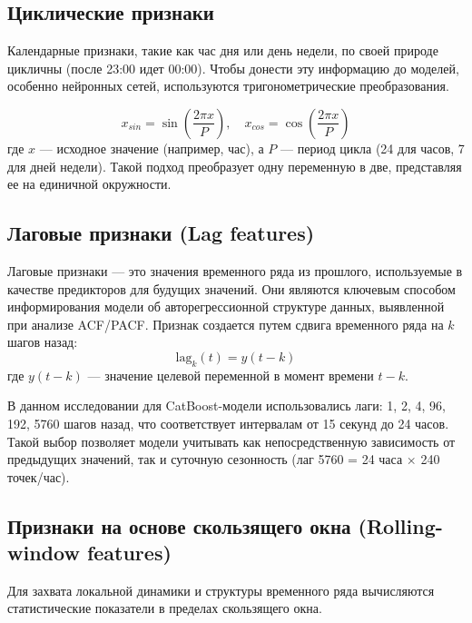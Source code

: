 \subsection{Циклические признаки}

\hspace*{1.25cm}Календарные признаки, такие как час дня или день недели, по своей природе цикличны (после 23:00 идет 00:00). Чтобы донести эту информацию до моделей, особенно нейронных сетей, используются тригонометрические преобразования.

\begin{equation}
	x_{sin} = \sin\left(\frac{2\pi x}{P}\right), \quad x_{cos} = \cos\left(\frac{2\pi x}{P}\right)
\end{equation}
где $x$ — исходное значение (например, час), а $P$ — период цикла (24 для часов, 7 для дней недели). Такой подход преобразует одну переменную в две, представляя ее на единичной окружности.

\subsection{Лаговые признаки (Lag features)}

\hspace*{1.25cm}Лаговые признаки — это значения временного ряда из прошлого, используемые в качестве предикторов для будущих значений. Они являются ключевым способом информирования модели об авторегрессионной структуре данных, выявленной при анализе ACF/PACF. Признак создается путем сдвига временного ряда на $k$ шагов назад:
\begin{equation}
	\text{lag}_k(t) = y(t-k)
\end{equation}
где $y(t-k)$ — значение целевой переменной в момент времени $t-k$.

\hspace*{1.25cm}В данном исследовании для CatBoost-модели использовались лаги: 1, 2, 4, 96, 192, 5760 шагов назад, что соответствует интервалам от 15 секунд до 24 часов. Такой выбор позволяет модели учитывать как непосредственную зависимость от предыдущих значений, так и суточную сезонность (лаг 5760 = 24 часа $\times$ 240 точек/час).

\subsection{Признаки на основе скользящего окна (Rolling-window features)}

\hspace*{1.25cm}Для захвата локальной динамики и структуры временного ряда вычисляются статистические показатели в пределах скользящего окна.

